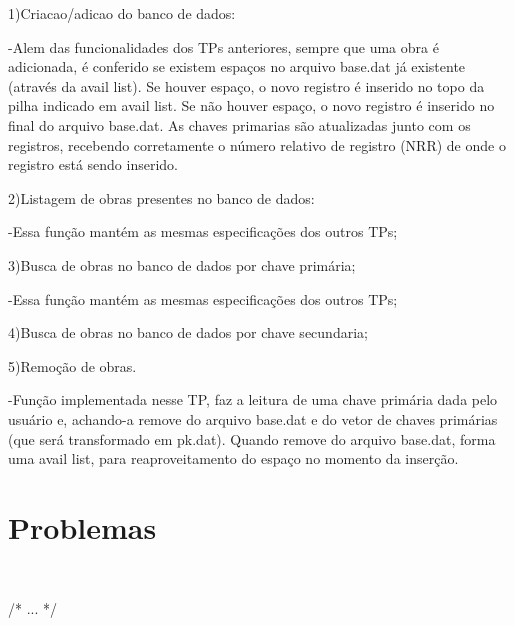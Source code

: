 \documentclass{article}
\begin{document}
1)Criacao/adicao do banco de dados:

-Alem das funcionalidades dos TPs anteriores, sempre que uma obra é adicionada, é conferido se existem espaços no arquivo base.dat já existente (através da avail list). 
Se houver espaço, o novo registro é inserido no topo da pilha indicado em avail list. Se não houver espaço, o novo registro é inserido no final do arquivo base.dat.
As chaves primarias são atualizadas junto com os registros, recebendo corretamente o número relativo de registro (NRR) de onde o registro está sendo inserido.

2)Listagem de obras presentes no banco de dados:

-Essa função mantém as mesmas especificações dos outros TPs;

3)Busca de obras no banco de dados por chave primária;

-Essa função mantém as mesmas especificações dos outros TPs;

4)Busca de obras no banco de dados por chave secundaria;



5)Remoção de obras.

-Função implementada nesse TP, faz a leitura de uma chave primária dada pelo usuário e, achando-a remove do arquivo base.dat e do vetor de chaves primárias (que será transformado em pk.dat).
Quando remove do arquivo base.dat, forma uma avail list, para reaproveitamento do espaço no momento da inserção.


\section{Problemas}\

/* ... */
\end{document}
